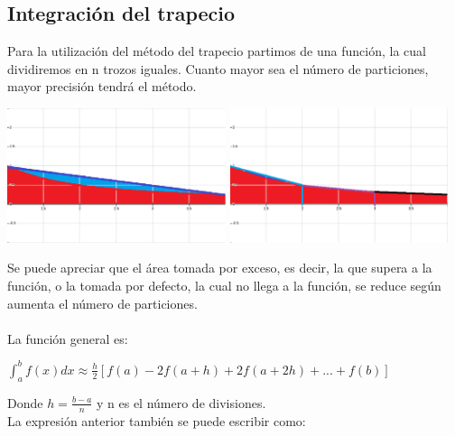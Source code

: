 \documentclass{article}
\begin{document}
    \subsection{Integración del trapecio}

      Para la utilización del método del trapecio partimos de una función, la cual dividiremos en n trozos iguales. Cuanto mayor sea el número de particiones, mayor precisión tendrá el método.\\

  	\begin{center}
         \includegraphics[width=0.48\textwidth]{img2.eps}
	 \includegraphics[width=0.48\textwidth]{img3.eps}
        \end{center}


      Se puede apreciar que el área tomada por exceso, es decir, la que supera a la función, o la tomada por defecto, la cual no llega a la función, se reduce según aumenta el número de particiones. \\
      \\

      La función general es: 
        
      \begin{center}
   
        $\int_{a}^{b}f(x)dx \approx \frac{h}{2}[f(a)-2f(a+h)+2f(a+2h)+...+f(b)]$

      \end{center}
 
      Donde $h=\frac{b-a}{n}$ y n es el número de divisiones.\\

      La expresión anterior también se puede escribir como:
\end{document}

